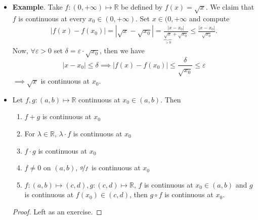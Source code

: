 \documentclass{article}
\newcommand{\R}{\mathbb{R}}
\newcommand{\N}{\mathbb{N}}
\newcommand{\seq}[2]{(#1_{#2})_{#2 \in \N}}
\newcommand{\?}{\stackrel{?}{=}}
\theoremstyle{definition} %
\begin{document}
\begin{itemize}
\begin{proof}
\begin{align*}
                  \implies & f(z_n) \longrightarrow f(x_0).
              \end{align*}
              For the other direction, assume that every sequence $\seq{z}{n}$, $z_n \in (a, b)$, $z_n \rightarrow x_0 \implies f(z_n) \rightarrow f(x_0)$. In particular, consider the sequences $\seq{z}{n}$, $z_n \in (a, b) \setminus \{x_0\}$, $z_n \rightarrow x_0 \implies f(z_n) \rightarrow f(x_0) \implies \lim_{x \to x_0} f(x) = \lim_{n \to \infty} f(z_n) = f(x_0)$.
          \end{proof}
    \item \textbf{Example}. Take $f: (0, +\infty) \mapsto \R$ be defined by $f(x) = \sqrt{x}$. We claim that $f$ is continuous at every $x_0 \in (0, +\infty)$. Set $x \in (0, +\infty$ and compute
          \begin{align*}
              |f(x) - f(x_0)| = |\sqrt{x} - \sqrt{x_0}| = \frac{|x - x_0|}{\underbrace{\sqrt{x}}_{> 0} + \sqrt{x_0}} \leq \frac{|x - x_0|}{\sqrt{x_0}}.
          \end{align*}
          Now, $\forall \varepsilon > 0$ set $\delta = \varepsilon \cdot \sqrt{x_0}$, then we have
          $$|x - x_0| \leq \delta \implies |f(x) - f(x_0)| \leq \frac{\delta}{\sqrt{x_0}} \leq \varepsilon$$
          $\implies \sqrt{x}$ is continuous at $x_0$.
    \item[]
          \begin{proposition}
              Let $f, g: (a, b) \mapsto \R$ continuous at $x_0 \in (a, b)$. Then
              \begin{enumerate}[label=(\roman*)]
                  \item $f + g$ is continuous at $x_0$
                  \item For $\lambda \in \R$, $\lambda \cdot f$ is continuous at $x_0$
                  \item $f \cdot g$ is continuous at $x_0$
                  \item $f \neq 0$ on $(a, b)$, $\nicefrac{g}{f}$ is continuous at $x_0$
                  \item $f: (a, b) \mapsto (c, d), g: (c, d) \mapsto \R$, $f$ is continuous at $x_0 \in (a, b)$ and $g$ is continuous at $f(x_0) \in (c, d)$, then $g \circ f$ is continuous at $x_0$.
              \end{enumerate}
          \end{proposition}
          \begin{proof}
              Left as an exercise.
          \end{proof}

\end{itemize}
\end{document}
